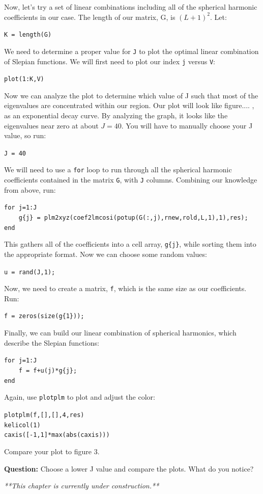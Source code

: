 \documentclass[11pt]{article}
\begin{document}
Now, let's try a set of linear combinations including all of the spherical harmonic coefficients in our case.  The length of our matrix, G, is $(L+1)^2$.  Let:

\verb|K = length(G)|

We need to determine a proper value for \verb+J+ to plot the optimal linear combination of Slepian functions.  We will first need to plot our index \verb+j+ versus \verb+V+:

\verb|plot(1:K,V)|

Now we can analyze the plot to determine which value of J such that most of the eigenvalues are concentrated within our region.  Our plot will look like figure.... , as an exponential decay curve.  By analyzing the graph, it looks like the eigenvalues near zero at about $J=40$.  You will have to manually choose your J value, so run:

\verb+J = 40+

We will need to use a \verb+for+ loop to run through all the spherical harmonic coefficients contained in the matrix \verb+G+, with \verb+J+ columns.  Combining our knowledge from above, run:

\verb+for j=1:J+\\
\verb+    g{j} = plm2xyz(coef2lmcosi(potup(G(:,j),rnew,rold,L,1),1),res);+\\
\verb+end+

This gathers all of the coefficients into a cell array, \verb+g{j}+, while sorting them into the appropriate format.  Now we can choose some random values:

\verb+u = rand(J,1);+

Now, we need to create a matrix, \verb+f+, which is the same size as our coefficients. Run:

\verb+f = zeros(size(g{1}));+

Finally, we can build our linear combination of spherical harmonics, which describe the Slepian functions:

\verb+for j=1:J+\\
\verb|    f = f+u(j)*g{j};|\\   
\verb+end+

Again, use \verb+plotplm+ to plot and adjust the color:

\verb+plotplm(f,[],[],4,res)+\\
\verb+kelicol(1)+\\
\verb+caxis([-1,1]*max(abs(caxis)))+

Compare your plot to figure 3.

\textbf{Question:} Choose a lower J value and compare the plots.  What do you notice?



\textit{**This chapter is currently under construction.**}
\end{document}

